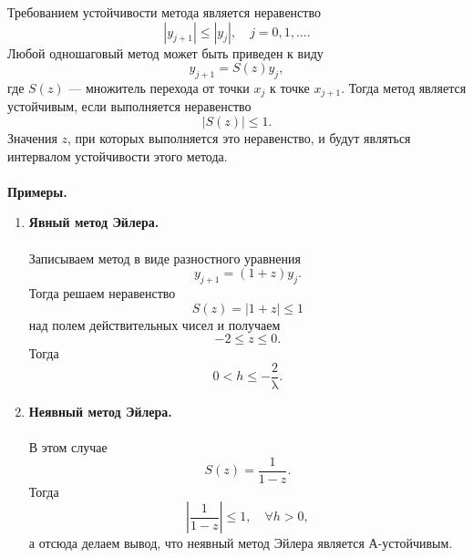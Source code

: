 \documentclass[a4paper, 12pt]{report}
\renewcommand{\leq}{\leqslant}
\renewcommand{\lambda}{\uplambda}
\begin{document}
	 Требованием устойчивости метода является неравенство $$|y_{j+1}|\leq |y_j|,\quad j = 0,1,\ldots.$$
	 Любой одношаговый метод может быть приведен к виду $$y_{j+1} = S(z) y_j,$$ где $S(z)$ --- множитель перехода от точки $x_j$ к точке $x_{j+1}$. Тогда метод является устойчивым, если выполняется неравенство $$|S(z)|\leq 1.$$ Значения $z$, при которых выполняется это неравенство, и будут являться интервалом устойчивости этого метода.
	 \\\\
	 \textbf{Примеры.}
	 \begin{enumerate}
	 	\item \textbf{Явный метод Эйлера.}\\\\
	 	Записываем метод в виде разностного уравнения $$y_{j+1} = (1+z) y_j.$$
	 	Тогда решаем неравенство $$S(z) = |1+z| \leq 1$$ над полем действительных чисел  и получаем $$-2 \leq z \leq 0.$$ Тогда $$0<h \leq -\dfrac 2 \lambda.$$
	 	\item \textbf{Неявный метод Эйлера.}\\\\
	 	В этом случае $$S(z) = \dfrac{1}{1-z}.$$
	 	Тогда $$\left|\dfrac{1}{1-z}\right|\leq 1,\quad \forall h > 0,$$
	 	а отсюда делаем вывод, что неявный метод Эйлера является А-устойчивым.
	 \end{enumerate}
	
\end{document}
